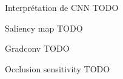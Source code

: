 \begin{frame}{Interprétation de CNN}
  \alert{TODO}
\end{frame}

\begin{frame}{Saliency map}
    \alert{TODO}
\end{frame}

\begin{frame}{Gradconv}
    \alert{TODO}
\end{frame}

\begin{frame}{Occlusion sensitivity}
  \alert{TODO}
\end{frame}

  